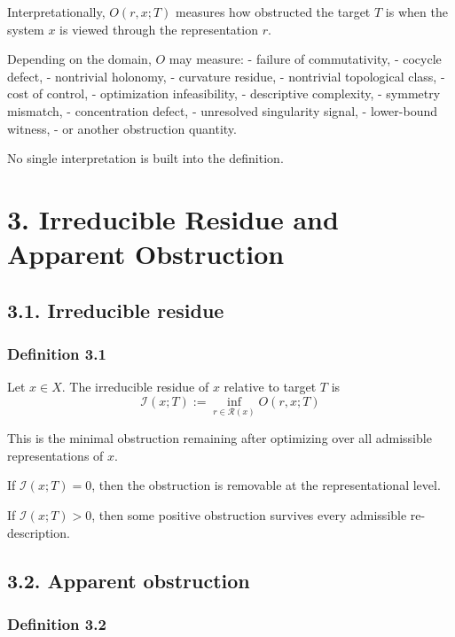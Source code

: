 \documentclass[
]{article}
\begin{document}
Interpretationally, \(O(r,x;T)\) measures how obstructed the target
\(T\) is when the system \(x\) is viewed through the representation
\(r\).

Depending on the domain, \(O\) may measure: - failure of commutativity,
- cocycle defect, - nontrivial holonomy, - curvature residue, -
nontrivial topological class, - cost of control, - optimization
infeasibility, - descriptive complexity, - symmetry mismatch, -
concentration defect, - unresolved singularity signal, - lower-bound
witness, - or another obstruction quantity.

No single interpretation is built into the definition.

\section{3. Irreducible Residue and Apparent
Obstruction}\label{irreducible-residue-and-apparent-obstruction}

\subsection{3.1. Irreducible residue}\label{irreducible-residue}

\subsubsection{Definition 3.1}\label{definition-3.1}

Let \(x \in X\). The irreducible residue of \(x\) relative to target
\(T\) is \[
\boxed{
\mathcal{I}(x;T) := \inf_{r \in \mathcal{R}(x)} O(r,x;T)
}
\]

This is the minimal obstruction remaining after optimizing over all
admissible representations of \(x\).

If \(\mathcal{I}(x;T) = 0\), then the obstruction is removable at the
representational level.

If \(\mathcal{I}(x;T) > 0\), then some positive obstruction survives
every admissible re-description.

\subsection{3.2. Apparent obstruction}\label{apparent-obstruction}

\subsubsection{Definition 3.2}\label{definition-3.2}
\end{document}

